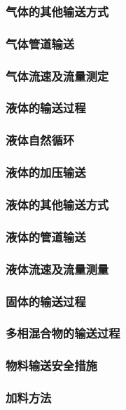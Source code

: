 \documentclass[UTF8]{../../ApplicationUniverse}
\begin{document}
            \subsubsection{气体的其他输送方式}
            \subsubsection{气体管道输送}
            \subsubsection{气体流速及流量测定}
        \subsubsection{液体的输送过程}
            \subsubsection{液体自然循环}
            \subsubsection{液体的加压输送}
            \subsubsection{液体的其他输送方式}
            \subsubsection{液体的管道输送}
            \subsubsection{液体流速及流量测量}
    \subsubsection{固体的输送过程}
    \subsubsection{多相混合物的输送过程}
    \subsubsection{物料输送安全措施}
    \subsubsection{加料方法}
\end{document}
